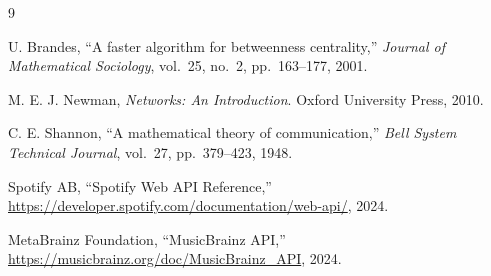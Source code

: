\documentclass[12pt,a4paper]{article}
\begin{document}
\begin{thebibliography}{9}

U. Brandes,
``A faster algorithm for betweenness centrality,''
\textit{Journal of Mathematical Sociology}, vol.~25, no.~2, pp.~163--177, 2001.

M. E. J. Newman,
\textit{Networks: An Introduction}.
Oxford University Press, 2010.

C. E. Shannon,
``A mathematical theory of communication,''
\textit{Bell System Technical Journal}, vol.~27, pp.~379--423, 1948.

Spotify AB,
``Spotify Web API Reference,''
\url{https://developer.spotify.com/documentation/web-api/}, 2024.

MetaBrainz Foundation,
``MusicBrainz API,''
\url{https://musicbrainz.org/doc/MusicBrainz_API}, 2024.

\end{thebibliography}
\end{document}
